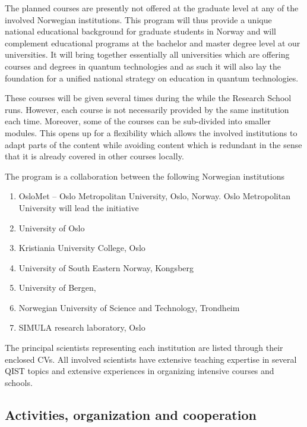\documentclass{scrreprt}
\begin{document}
The planned  courses are presently not offered at the graduate level at any
of the involved Norwegian institutions.  This program will thus provide
a unique national educational background for graduate students in
Norway and will complement educational programs at the bachelor and
master degree level at our universities. It will bring together
essentially all universities which are offering courses and degrees in
quantum technologies and as such it will also lay the foundation for a
unified national strategy on education in quantum technologies.

These courses will be given several times during the while the Research School runs. However, each course is not necessarily provided by the same institution each time. Moreover, some of the courses can be sub-divided into smaller modules. This opens up for a flexibility which allows the involved institutions to adapt parts of the content while avoiding content which is redundant in the sense that it is already covered in other courses locally.




The program is a collaboration between the following Norwegian institutions

\begin{enumerate}
\item OsloMet -- Oslo Metropolitan University, Oslo, Norway. Oslo Metropolitan University will lead the initiative
\item  University of Oslo
\item Kristiania University College, Oslo
\item University of South Eastern Norway, Kongsberg
\item  University of Bergen, 
\item 
Norwegian University of Science and Technology, Trondheim
\item SIMULA research laboratory, Oslo
\end{enumerate}
The principal scientists representing each institution are listed through their enclosed CVs. All involved scientists have extensive teaching expertise in several QIST topics and extensive experiences in organizing intensive courses and schools. 

\subsection{Activities, organization and cooperation}
\end{document}
